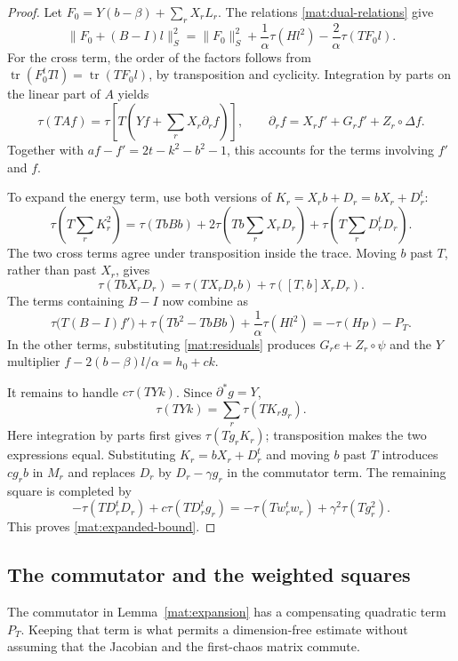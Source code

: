 \documentclass[11pt]{article}
\DeclareMathOperator{\tr}{tr}
\newcommand{\Id}{I}
\theoremstyle{definition}
\theoremstyle{remark}
\numberwithin{equation}{section}
\begin{document}
\begin{proof}
Let $F_0=Y(b-\beta)+\sum_rX_rL_r$.  The relations
\eqref{mat:dual-relations} give
\[
 \|F_0+(B-\Id)l\|_S^2
 =\|F_0\|_S^2+\frac1\alpha\tau(Hl^2)
                    -\frac2\alpha\tau(TF_0l).
\]
For the cross term, the order of the factors follows from
$\tr(F_0^tTl)=\tr(TF_0l)$, by transposition and cyclicity.
Integration by parts on the linear part of $A$ yields
\[
 \tau(TAf)=\tau\left[T\left(Yf+\sum_rX_r\partial_rf\right)\right],
 \qquad
 \partial_rf=X_rf'+G_rf'+Z_r\circ\Delta f.
\]
Together with $af-f'=2t-k^2-b^2-1$, this accounts for the terms involving
$f'$ and $f$.

To expand the energy term, use both versions of
$K_r=X_rb+D_r=bX_r+D_r^t$:
\begin{equation}\label{mat:K-square}
 \tau\left(T\sum_rK_r^2\right)
 =\tau(TbBb)+2\tau\left(Tb\sum_rX_rD_r\right)
             +\tau\left(T\sum_rD_r^tD_r\right).
\end{equation}
The two cross terms agree under transposition inside the trace.  Moving
$b$ past $T$, rather than past $X_r$, gives
\[
 \tau(TbX_rD_r)=\tau(TX_rD_rb)+\tau([T,b]X_rD_r).
\]
The terms containing $B-\Id$ now combine as
\[
 \tau\bigl(T(B-\Id)f'\bigr)+\tau(Tb^2-TbBb)
                 +\frac1\alpha\tau(Hl^2)
 =-\tau(Hp)-P_T.
\]
In the other terms, substituting \eqref{mat:residuals} produces
$G_re+Z_r\circ\psi$ and the $Y$ multiplier
$f-2(b-\beta)l/\alpha=h_0+ck$.

It remains to handle $c\tau(TYk)$.  Since $\partial^*g=Y$,
\[
 \tau(TYk)=\sum_r\tau(TK_rg_r).
\]
Here integration by parts first gives $\tau(Tg_rK_r)$; transposition
makes the two expressions equal.  Substituting $K_r=bX_r+D_r^t$ and
moving $b$ past $T$ introduces $cg_rb$ in $M_r$ and replaces $D_r$ by
$D_r-\gamma g_r$ in the commutator term.  The remaining square is
completed by
\[
 -\tau(TD_r^tD_r)+c\tau(TD_r^tg_r)
 =-\tau(Tw_r^tw_r)+\gamma^2\tau(Tg_r^2).
\]
This proves \eqref{mat:expanded-bound}.
\end{proof}

\subsection{The commutator and the weighted squares}

The commutator in Lemma~\ref{mat:expansion} has a compensating quadratic
term $P_T$.  Keeping that term is what permits a dimension-free estimate
without assuming that the Jacobian and the first-chaos matrix commute.
\end{document}
